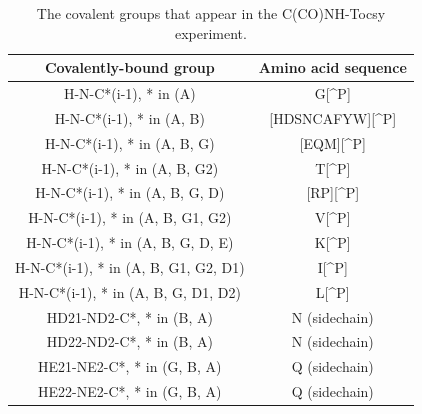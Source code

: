 \begin{table}
  \begin{tabular}{ | c | c | }
    \hline
    Covalently-bound group         &  Amino acid sequence  \\  \hline
    H-N-C*(i-1), * in (A)               &  G[\^{}P]             \\  \hline
    H-N-C*(i-1), * in (A, B)            &  [HDSNCAFYW][\^{}P]   \\  \hline
    H-N-C*(i-1), * in (A, B, G)         &  [EQM][\^{}P]         \\  \hline
    H-N-C*(i-1), * in (A, B, G2)        &  T[\^{}P]             \\  \hline
    H-N-C*(i-1), * in (A, B, G, D)      &  [RP][\^{}P]          \\  \hline
    H-N-C*(i-1), * in (A, B, G1, G2)    &  V[\^{}P]             \\  \hline
    H-N-C*(i-1), * in (A, B, G, D, E)   &  K[\^{}P]             \\  \hline
    H-N-C*(i-1), * in (A, B, G1, G2, D1)&  I[\^{}P]             \\  \hline
    H-N-C*(i-1), * in (A, B, G, D1, D2) &  L[\^{}P]             \\  \hline
    HD21-ND2-C*, * in (B, A)            &  N (sidechain)            \\  \hline
    HD22-ND2-C*, * in (B, A)            &  N (sidechain)            \\  \hline
    HE21-NE2-C*, * in (G, B, A)         &  Q (sidechain)            \\  \hline
    HE22-NE2-C*, * in (G, B, A)         &  Q (sidechain)            \\  \hline
  \end{tabular}
  \caption{The covalent groups that appear in the C(CO)NH-Tocsy experiment.}
  \label{cconh_peaktypes}
\end{table}

